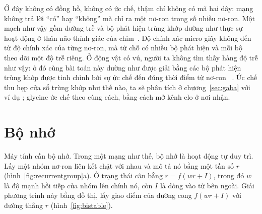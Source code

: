 Ở đây không có đồng hồ, không có ức chế, thậm chí không có mã hai dây: mạng không trả lời ``có'' hay ``không'' mà chỉ ra một nơ-ron trong số nhiều nơ-ron. Một mạch như vậy gồm đường trễ và bộ phát hiện trùng khớp dường như thực sự hoạt động ở thân não thính giác của chim~\cite{Carr1990}. Độ chính xác micro giây không đến từ độ chính xác của từng nơ-ron, mà từ chỗ có nhiều bộ phát hiện và mỗi bộ theo dõi một độ trễ riêng. Ở động vật có vú, người ta không tìm thấy hàng độ trễ như vậy: ở đó cùng bài toán này dường như được giải bằng các bộ phát hiện trùng khớp được tinh chỉnh bởi sự ức chế đến đúng thời điểm từ nơ-ron ~\cite{Brand2002,Grothe2010}. Ức chế thu hẹp cửa sổ trùng khớp như thế nào, ta sẽ phân tích ở chương~\ref{sec:gaba} với ví dụ ; glycine ức chế theo cùng cách, bằng cách mở kênh clo ở nơi nhận.

\section{Bộ nhớ}

Máy tính cần bộ nhớ. Trong một mạng như thế, bộ nhớ là hoạt động tự duy trì. Lấy một nhóm nơ-ron  liên kết chặt với nhau và mô tả nó bằng một tần số $r$ (hình~\ref{fig:recurrentgroup}a). Ở trạng thái cân bằng $r=f(wr+I)$, trong đó $w$ là độ mạnh hồi tiếp của nhóm lên chính nó, còn $I$ là dòng vào từ bên ngoài. Giải phương trình này bằng đồ thị, lấy giao điểm của đường cong $f(wr+I)$ với đường thẳng $r$ (hình~\ref{fig:bistable}).

